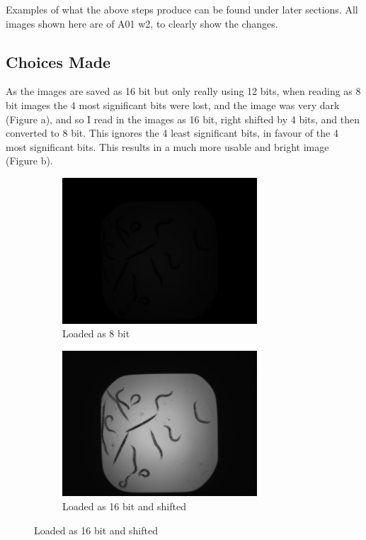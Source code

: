 \documentclass[a4paper,12pt]{article}
\begin{document}
Examples of what the above steps produce can be found under later sections. All images shown here are of A01 w2, to clearly show the changes.

\subsection*{Choices Made}
As the images are saved as 16 bit but only really using 12 bits, when reading as 8 bit images the 4 most significant bits were lost, and the image was very dark (Figure a), and so I read in the images as 16 bit, right shifted by 4 bits, and then converted to 8 bit. This ignores the 4 least significant bits, in favour of the 4 most significant bits. This results in a much more usable and bright image (Figure b).\\
\begin{figure}[ht!]
    \centering
    \begin{subfigure}{0.5\textwidth}
        \centering
        \includegraphics[width=0.8\textwidth]{A01_step0_unshifted.jpg}
        \caption{Loaded as 8 bit}
    \end{subfigure}%
    \begin{subfigure}{0.5\textwidth}
        \centering
        \includegraphics[width=0.8\textwidth]{A01_step0.jpg}
        \caption{Loaded as 16 bit and shifted}
    \end{subfigure}
\end{figure}
\end{document}
